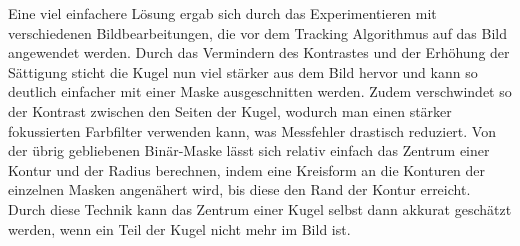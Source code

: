 \documentclass[12pt, ngerman]{article}
\begin{document}
Eine viel einfachere Lösung ergab sich durch das Experimentieren mit verschiedenen Bildbearbeitungen, die vor dem Tracking Algorithmus auf das Bild angewendet werden.  
Durch das Vermindern des Kontrastes und der Erhöhung der Sättigung sticht die Kugel nun viel stärker aus dem Bild hervor und kann so deutlich einfacher mit einer Maske ausgeschnitten werden. Zudem verschwindet so der Kontrast zwischen den Seiten der Kugel, wodurch man einen stärker fokussierten Farbfilter verwenden kann, was Messfehler drastisch reduziert.  
Von der übrig gebliebenen Binär-Maske lässt sich relativ einfach das Zentrum einer Kontur und der Radius berechnen, indem eine Kreisform an die Konturen der einzelnen Masken angenähert wird, bis diese den Rand der Kontur erreicht. Durch diese Technik kann das Zentrum einer Kugel selbst dann akkurat geschätzt werden, wenn ein Teil der Kugel nicht mehr im Bild ist.
\end{document}
